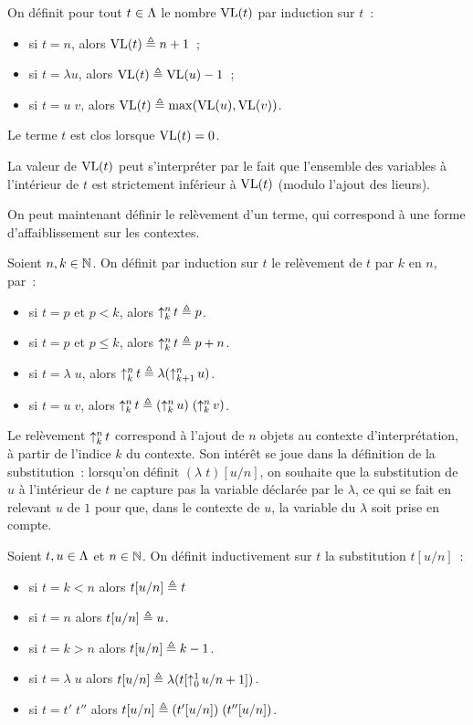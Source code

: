 \begin{definition}
  On définit pour tout $t \in \lamSet$ le nombre $\VL(t)$ par induction sur
  $t$~:
  \begin{itemize}
  \item si $t = n$, alors $\VL(t) \defeq n + 1$~;
  \item si $t = \lambda u$, alors $\VL(t) \defeq \VL(u) - 1$~;
  \item si $t = u\;v$, alors $\VL(t) \defeq \max(\VL(u),\VL(v))$.
  \end{itemize}
  Le terme $t$ est clos lorsque $\VL(t) = 0$.
\end{definition}

La valeur de $\VL(t)$ peut s'interpréter par le fait que l'ensemble des
variables à l'intérieur de $t$ est strictement inférieur à $\VL(t)$ (modulo
l'ajout des lieurs).

On peut maintenant définir le relèvement d'un terme, qui correspond à une forme
d'affaiblissement sur les contextes.

\begin{definition}
  Soient $n,k \in \bN$. On définit par induction sur $t$ le relèvement de $t$
  par $k$ en $n$, par~:
  \begin{itemize}
  \item si $t = p$ et $p < k$, alors $\lift t k n \defeq p$.
  \item si $t = p$ et $p \leq k$, alors $\lift t k n \defeq p + n$.
  \item si $t = \lambda\;u$, alors
    $\lift t k n \defeq \lambda (\lift u {k+1} n)$.
  \item si $t = u\;v$, alors $\lift t k n \defeq (\lift u k n)\;(\lift v k n)$.
  \end{itemize}
\end{definition}

Le relèvement $\lift t k n$ correspond à l'ajout de $n$ objets au contexte
d'interprétation, à partir de l'indice $k$ du contexte. Son intérêt se joue dans
la définition de la substitution~: lorsqu'on définit $(\lambda\;t)[u/n]$, on
souhaite que la substitution de $u$ à l'intérieur de $t$ ne capture pas la
variable déclarée par le $\lambda$, ce qui se fait en relevant $u$ de $1$
pour que, dans le contexte de $u$, la variable du $\lambda$ soit prise en
compte.

\begin{definition}[Substitution]
  Soient $t,u \in \lamSet$ et $n \in \bN$. On définit inductivement sur $t$
  la substitution $t[u/n]$~:
  \begin{itemize}
  \item si $t = k < n$ alors $t[u/n] \defeq t$
  \item si $t = n$ alors $t[u/n] \defeq u$.
  \item si $t = k > n$ alors $t[u/n] \defeq k - 1$.
  \item si $t = \lambda\;u$ alors
    $t[u/n] \defeq \lambda(t[\lift u 0 1/n+1])$.
  \item si $t = t'\;t''$ alors $t[u/n] \defeq (t'[u/n])\;(t''[u/n])$.
  \end{itemize}
\end{definition}

